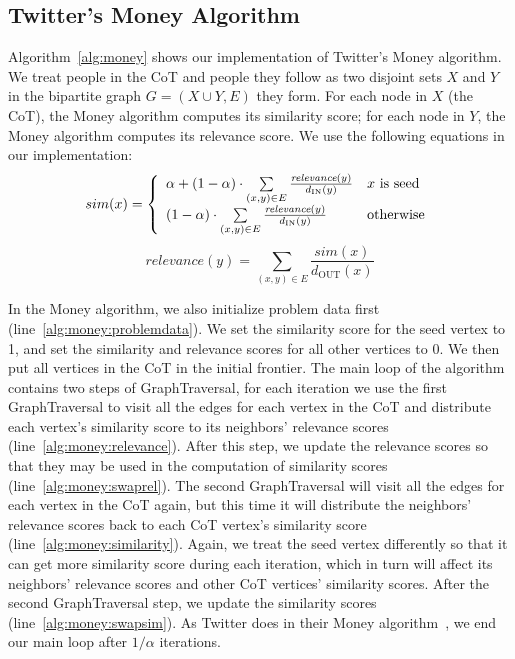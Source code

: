 \documentclass{article}
\renewcommand{\cite}[1]{}
\begin{document}
\subsection{Twitter's Money Algorithm} Algorithm~\ref{alg:money} shows our implementation of Twitter's Money algorithm. We treat people in the CoT and people they follow as two disjoint sets $X$ and $Y$ in the bipartite graph $G = (X \cup Y, E)$ they form. For each node in $X$ (the CoT), the Money algorithm computes its similarity score; for each node in $Y$, the Money algorithm computes its relevance score. We use the following equations in our implementation:
\begin{equation}
  sim(x) = \left\{
  \begin{array}{l l}
    \alpha + (1-\alpha) \cdot \sum\limits_{(x,y) \in E} \frac{\textit{relevance}(y)}{d_\text{IN}(y)} & \text{$x$ \textrm{is seed}}\\
    (1-\alpha) \cdot \sum\limits_{(x,y) \in E} \frac{\textit{relevance}(y)}{d_\text{IN}(y)} & \text{otherwise}
  \end{array} \right.
\end{equation}
\begin{equation}
  \textit{relevance}(y) = \sum\limits_{(x,y)\in E} \frac{\textit{sim}(x)}{d_\text{OUT}(x)}
\end{equation}

In the Money algorithm, we also initialize problem data first (line~\ref{alg:money:problemdata}). We set the similarity score for the seed vertex to 1, and set the similarity and relevance scores for all other vertices to 0. We then put all vertices in the CoT in the initial frontier. The main loop of the algorithm contains two steps of GraphTraversal, for each iteration we use the first GraphTraversal to visit all the edges for each vertex in the CoT and distribute each vertex's similarity score to its neighbors' relevance scores (line~\ref{alg:money:relevance}). After this step, we update the relevance scores so that they may be used in the computation of similarity scores (line~\ref{alg:money:swaprel}). The second GraphTraversal will visit all the edges for each vertex in the CoT again, but this time it will distribute the neighbors' relevance scores back to each CoT vertex's similarity score (line~\ref{alg:money:similarity}). Again, we treat the seed vertex differently so that it can get more similarity score during each iteration, which in turn will affect its neighbors' relevance scores and other CoT vertices' similarity scores. After the second GraphTraversal step, we update the similarity scores (line~\ref{alg:money:swapsim}). As Twitter does in their Money algorithm~\cite{Goel:2014:TWT}, we end our main loop after $1/\alpha$ iterations.
\end{document}
